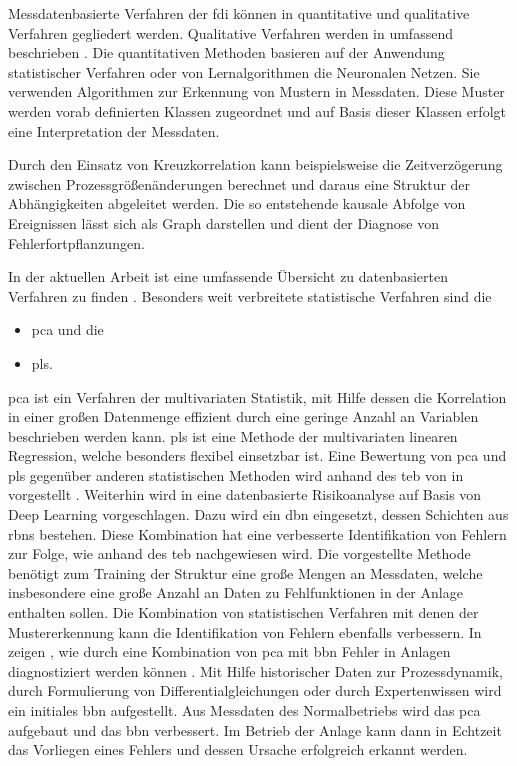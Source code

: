 Messdatenbasierte Verfahren der \ac{fdi} k\"onnen in quantitative und qualitative Verfahren gegliedert werden. Qualitative Verfahren werden in  umfassend beschrieben \cite[S. 2 ff.]{Venkatasubramanian_2003b}. Die quantitativen Methoden basieren auf der Anwendung statistischer Verfahren oder von Lernalgorithmen die Neuronalen Netzen. Sie verwenden Algorithmen zur Erkennung von Mustern in Messdaten. Diese Muster werden vorab definierten Klassen zugeordnet und auf Basis dieser Klassen erfolgt eine Interpretation der Messdaten.

Durch den Einsatz von Kreuzkorrelation kann beispielsweise die Zeitverz\"ogerung zwischen Prozessgr\"o\ss{}en\"anderungen berechnet und daraus eine Struktur der Abh\"angigkeiten abgeleitet werden. Die so entstehende kausale Abfolge von Ereignissen l\"asst sich als Graph darstellen und dient der Diagnose von Fehlerfortpflanzungen. \cite{Bauer_2008}

In der aktuellen Arbeit  ist eine umfassende \"Ubersicht zu datenbasierten Verfahren zu finden \cite{Zhang_2017}. Besonders weit verbreitete statistische Verfahren sind die \begin{itemize}
\item \ac{pca} und die
\item \ac{pls}.
\end{itemize}
\ac{pca} ist ein Verfahren der multivariaten Statistik, mit Hilfe dessen die Korrelation in einer gro\ss{}en Datenmenge effizient durch eine geringe Anzahl an Variablen beschrieben werden kann. \ac{pls} ist eine Methode der multivariaten linearen Regression, welche besonders flexibel einsetzbar ist. Eine Bewertung von \ac{pca} und \ac{pls} gegen\"uber anderen statistischen Methoden wird anhand des \ac{teb} von \citeauthor{Yin2012} in  vorgestellt \cite{Yin2012}. \newline
Weiterhin wird in \cite{Zhang_2017} eine datenbasierte Risikoanalyse auf Basis von Deep Learning vorgeschlagen. Dazu wird ein \ac{dbn} eingesetzt, dessen Schichten aus \acp{rbn} bestehen. Diese Kombination hat eine verbesserte Identifikation von Fehlern zur Folge, wie anhand des \ac{teb} nachgewiesen wird. Die vorgestellte Methode ben\"otigt zum Training der Struktur eine gro\ss{}e Mengen an Messdaten, welche insbesondere eine gro\ss{}e Anzahl an Daten zu Fehlfunktionen in der Anlage enthalten sollen. \newline
Die Kombination von statistischen Verfahren mit denen der Mustererkennung kann die Identifikation von Fehlern ebenfalls verbessern. In  zeigen \citeauthor{Mallick_2013}, wie durch eine Kombination von \ac{pca} mit \ac{bbn} Fehler in Anlagen diagnostiziert werden k\"onnen \cite{Mallick_2013}. Mit Hilfe historischer Daten zur Prozessdynamik, durch Formulierung von Differentialgleichungen oder durch Expertenwissen wird ein initiales \ac{bbn} aufgestellt. Aus Messdaten des Normalbetriebs wird das \ac{pca} aufgebaut und das \ac{bbn} verbessert. Im Betrieb der Anlage kann dann in Echtzeit das Vorliegen eines Fehlers und dessen Ursache erfolgreich erkannt werden. 